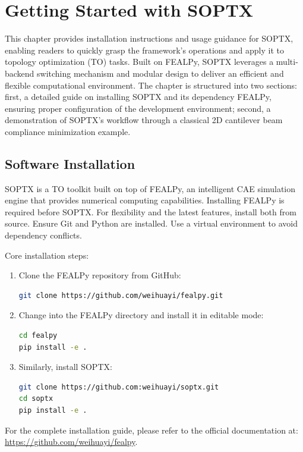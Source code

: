 \documentclass[mathpazo]{cicp}
\begin{document}
\section{Getting Started with SOPTX}
This chapter provides installation instructions and usage guidance for SOPTX, enabling readers to quickly grasp the framework's operations and apply it to topology optimization (TO) tasks. Built on FEALPy, SOPTX leverages a multi-backend switching mechanism and modular design to deliver an efficient and flexible computational environment. The chapter is structured into two sections: first, a detailed guide on installing SOPTX and its dependency FEALPy, ensuring proper configuration of the development environment; second, a demonstration of SOPTX's workflow through a classical 2D cantilever beam compliance minimization example.

\subsection{Software Installation}
SOPTX is a TO toolkit built on top of FEALPy, an intelligent CAE simulation engine that provides numerical computing capabilities. Installing FEALPy is required before SOPTX. For flexibility and the latest features, install both from source. Ensure Git and Python are installed. Use a virtual environment to avoid dependency conflicts.

Core installation steps:
\begin{enumerate} 
	\item Clone the FEALPy repository from GitHub:
\begin{lstlisting}[language=bash]
git clone https://github.com/weihuayi/fealpy.git
\end{lstlisting}
	\item Change into the FEALPy directory and install it in editable mode:
\begin{lstlisting}[language=bash]
cd fealpy
pip install -e . 
\end{lstlisting}
	\item Similarly, install SOPTX:
\begin{lstlisting}[language=bash]
git clone https://github.com:weihuayi/soptx.git
cd soptx
pip install -e . 
\end{lstlisting}
\end{enumerate}

For the complete installation guide, please refer to the official documentation at: \url{https://github.com/weihuayi/fealpy}.
\end{document}
